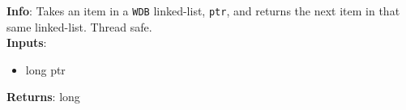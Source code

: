 \textbf{Info}: Takes an item in a \texttt{WDB} linked-list, \texttt{ptr}, and
returns the next item in that same linked-list. Thread safe. \\

\noindent \textbf{Inputs}:
\begin{itemize}
\item{long ptr}
\end{itemize}

\noindent \textbf{Returns}: long
